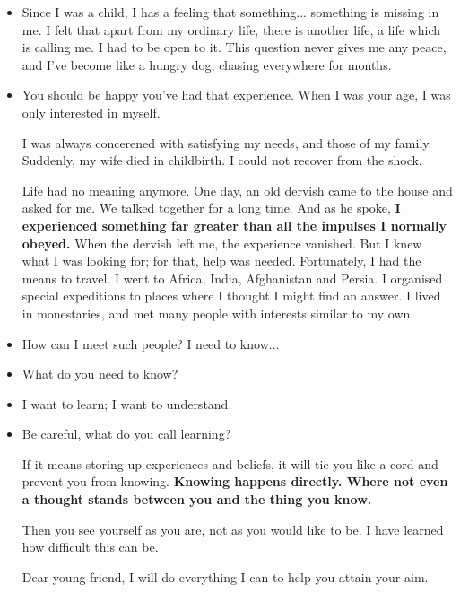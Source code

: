 \begin{itemize}
\item[\textbf{G.}] Since I was a child, I has a feeling that something...  something is missing in me.  I felt that apart from my ordinary life, there is another life, a life which is calling me.  I had to be open to it. This question never gives me any peace, and I've become like a hungry dog, chasing everywhere for months.  


\item[\textbf{Y.}] You should be happy you've had that experience. When I was your age,  I was only interested in myself. \par I was always concerened with satisfying my needs,  and those of my family.  Suddenly, my wife died in childbirth. I could not recover from the shock. \par 
Life had no meaning anymore.  One day, an old dervish came to the house and asked for me.  We talked together for a long time. And as he spoke,  \textbf{I experienced something far greater than all the impulses I normally obeyed. } When the dervish left me, the experience vanished. But I knew what I was looking for; for that, help was needed.  Fortunately, I had the means to travel.  I went to Africa, India, Afghanistan and Persia. I organised special expeditions to places where I thought I might find an answer.  I lived in monestaries, and met many people with interests similar to my own. 

\item[\textbf{G.}] How can I meet such people? I need to know...


\item[\textbf{Y.}] What do you need to know? 


\item[\textbf{G.}] I want to learn; I want to understand. 


\item[\textbf{Y.}] Be careful, what do you call learning?\par 
If it means storing up experiences and beliefs, it will tie you like a cord and prevent you from knowing.  \textbf{Knowing happens directly. Where not even a thought stands between you and the thing you know. }\par 
Then you see yourself as you are, not as you would like to be.  I have learned how difficult this can be. \par
Dear young friend, I will do everything I can to help you attain your aim. 




\end{itemize}


